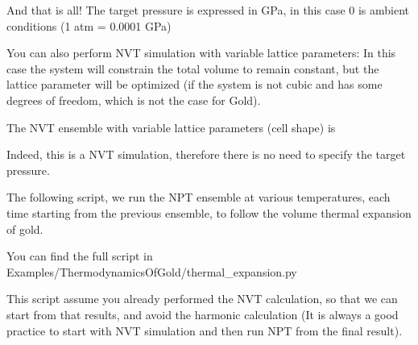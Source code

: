 \documentclass[a4paper,11pt,english]{sphinxmanual}
\begin{document}
\sphinxAtStartPar
And that is all! The target pressure is expressed in GPa, in this case 0 is ambient conditions (1 atm = 0.0001 GPa)

\sphinxAtStartPar
You can also perform NVT simulation with variable lattice parameters: In this case the system will constrain the total volume to remain constant, but the lattice parameter will be optimized (if the system is not cubic and has some degrees of freedom, which is not the case for Gold).

\sphinxAtStartPar
The NVT ensemble with variable lattice parameters (cell shape) is

\begin{sphinxVerbatim}[commandchars=\\\{\}]
  
\end{sphinxVerbatim}

\sphinxAtStartPar
Indeed, this is a NVT simulation, therefore there is no need to specify the target pressure.

\sphinxAtStartPar
The following script, we run the NPT ensemble at various temperatures, each time starting from the previous ensemble, to follow the volume thermal expansion of gold.

\sphinxAtStartPar
You can find the full script in Examples/ThermodynamicsOfGold/thermal\_expansion.py

\sphinxAtStartPar
This script assume you already performed the NVT calculation, so that we can start from that results, and avoid the harmonic calculation (It is always a good practice to start with NVT simulation and then run NPT from the final result).
\end{document}
